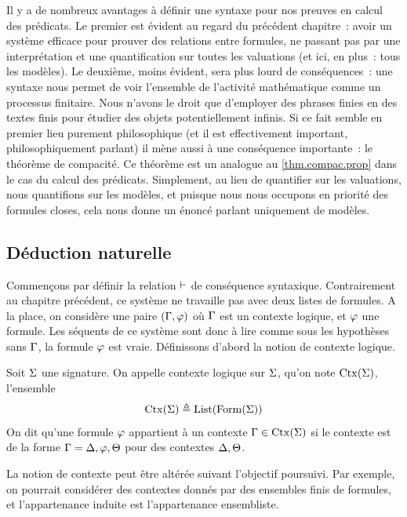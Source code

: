Il y a de nombreux avantages à définir une syntaxe pour nos preuves en calcul
des prédicats. Le premier est évident au regard du précédent chapitre~: avoir
un système efficace pour prouver des relations entre formules, ne passant pas
par une interprétation et une quantification sur toutes les valuations (et ici,
en plus~: tous les modèles). Le deuxième, moins évident, sera plus lourd de
conséquences~: une syntaxe nous permet de voir l'ensemble de l'activité
mathématique comme un processus finitaire. Nous n'avons le droit que d'employer
des phrases finies en des textes finis pour étudier des objets potentiellement
infinis. Si ce fait semble en premier lieu purement philosophique (et il est
effectivement important, philosophiquement parlant) il mène aussi à une
conséquence importante~: le théorème de compacité. Ce théorème est un analogue
au \cref{thm.compac.prop} dans le cas du calcul des prédicats. Simplement, au
lieu de quantifier sur les valuations, nous quantifions sur les modèles, et
puisque nous nous occupons en priorité des formules closes, cela nous donne un
énoncé parlant uniquement de modèles.

\subsection{Déduction naturelle}

Commençons par définir la relation $\vdash$ de conséquence syntaxique.
Contrairement au chapitre précédent, ce système ne travaille pas avec deux
listes de formules. A la place, on considère une paire $(\Gamma,\varphi)$ où
$\Gamma$ est un contexte logique, et $\varphi$ une formule. Les séquents de ce
système sont donc à lire comme \og sous les hypothèses sans $\Gamma$, la formule
$\varphi$ est vraie\fg. Définissons d'abord la notion de contexte logique.

\begin{definition}
  Soit $\Sigma$ une signature. On appelle contexte logique sur $\Sigma$, qu'on
  note $\operatorname{Ctx}(\Sigma)$, l'ensemble
  \[\operatorname{Ctx}(\Sigma) \triangleq \operatorname{List}(\operatorname{Form}(\Sigma))\]
  On dit qu'une formule $\varphi$ appartient à un contexte $\Gamma\in\operatorname{Ctx}(\Sigma)$
  si le contexte est de la forme $\Gamma = \Delta, \varphi, \Theta$
  pour des contextes $\Delta,\Theta$.
\end{definition}

\begin{remark}
  La notion de contexte peut être altérée suivant l'objectif poursuivi. Par
  exemple, on pourrait considérer des contextes donnés par des ensembles
  finis de formules, et l'appartenance induite est l'appartenance ensembliste.
\end{remark}

